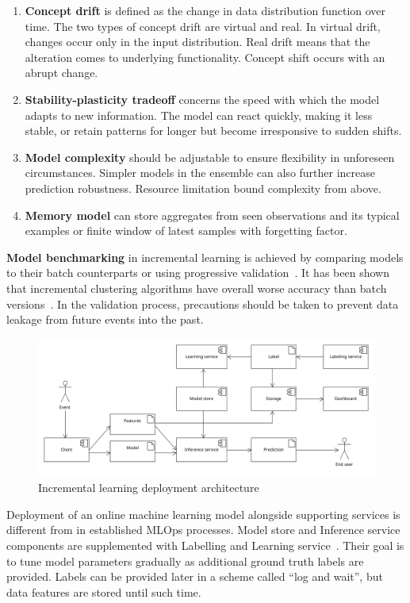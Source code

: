 \begin{enumerate}
    \itemsep0pt

    \item \textbf{Concept drift} is defined as the change in data distribution function over time. The two types of concept drift are virtual and real. In virtual drift, changes occur only in the input distribution. Real drift means that the alteration comes to underlying functionality. Concept shift occurs with an abrupt change.

    \item \textbf{Stability-plasticity tradeoff} concerns the speed with which the model adapts to new information. The model can react quickly, making it less stable, or retain patterns for longer but become irresponsive to sudden shifts.

    \item \textbf{Model complexity} should be adjustable to ensure flexibility in unforeseen circumstances. Simpler models in the ensemble can also further increase prediction robustness. Resource limitation bound complexity from above.

    \item \textbf{Memory model} can store aggregates from seen observations and its typical examples or finite window of latest samples with forgetting factor.
\end{enumerate}


\textbf{Model benchmarking} in incremental learning is achieved by comparing models to their batch counterparts or using progressive validation~\cite{blum_beating_1999, halford_correct_2020}. It has been shown that incremental clustering algorithms have overall worse accuracy than batch versions~\cite{gepperth_incremental_2016}. In the validation process, precautions should be taken to prevent data leakage from future events into the past.

\begin{figure}[ht]
    \centering
    \includegraphics[width=\textwidth]{assets/analysis/incremental-learning.png}
    \caption{Incremental learning deployment architecture~\cite{gaia_online_2022}}
    \label{fig:online-learn-arch}
\end{figure} 

Deployment of an online machine learning model alongside supporting services is different from in established MLOps processes. Model store and Inference service components are supplemented with Labelling and Learning service~\cite{gaia_online_2022}. Their goal is to tune model parameters gradually as additional ground truth labels are provided. Labels can be provided later in a scheme called ``log and wait'', but data features are stored until such time.
  
